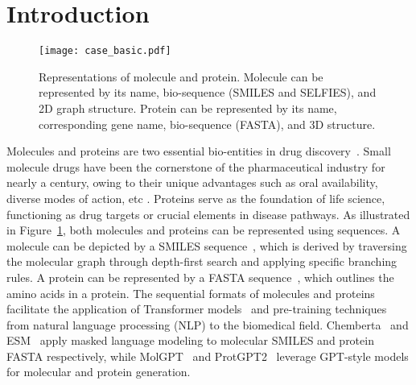 \documentclass[11pt]{article}
\begin{document}
\section{Introduction}
\begin{figure}
    \centering
    \texttt{[image: case\_basic.pdf]}
    \caption{Representations of molecule and protein. Molecule can be represented by its name, bio-sequence (SMILES and SELFIES), and 2D graph structure. Protein can be represented by its name, corresponding gene name, bio-sequence (FASTA), and 3D structure.}
    \label{fig:molecule_protein_rep}
\end{figure}
Molecules and proteins are two essential bio-entities in drug discovery~\citep{dara2022machine}. 
Small molecule drugs have been the cornerstone of the pharmaceutical industry for nearly a century, owing to their unique advantages such as oral availability, diverse modes of action, etc \citep{future_smallM}. Proteins serve as the foundation of life science, functioning as drug targets or crucial elements in disease pathways.
As illustrated in Figure~\ref{fig:molecule_protein_rep}, both molecules and proteins can be represented using sequences. 
A molecule can be depicted by a SMILES sequence~\citep{weininger1988smiles,weininger1989smiles}, which is derived by traversing the molecular graph through depth-first search and applying specific branching rules. 
A protein can be represented by a FASTA sequence~\citep{lipman1985rapid,pearson1988improved}, which outlines the amino acids in a protein.
The sequential formats of molecules and proteins facilitate the application of Transformer models~\citep{vaswani2017attention} and pre-training techniques~\citep{liu2019roberta,radford2019language} from natural language processing (NLP) to the biomedical field. 
Chemberta~\citep{chithrananda2020chemberta} and ESM~\citep{rives2021biological,lin2022language} apply masked language modeling to molecular SMILES and protein FASTA respectively, while MolGPT~\citep{DBLP:journals/jcisd/BagalAVP22} and ProtGPT2~\citep{ferruz2022protgpt2} leverage GPT-style models for molecular and protein generation.
\end{document}
